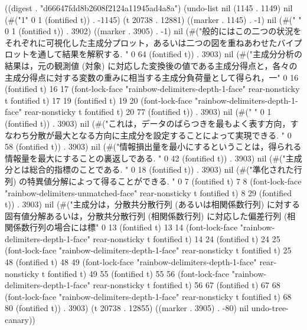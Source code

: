 
((digest . "d66647fdd8b2608f2124a11945ad4a8a") (undo-list nil (1145 . 1149) nil (#("1" 0 1 (fontified t)) . -1145) (t 20738 . 12881) ((marker . 1145) . -1) nil (#("
" 0 1 (fontified t)) . 3902) ((marker . 3905) . -1) nil (#("般的にはこの二つの状況をそれぞれに可視化した主成分プロット，あるいは二つの図を重ねあわせたバイプロットを通して結果を解釈する.
" 0 64 (fontified t)) . 3903) nil (#("主成分分析の結果は，元の観測値 (対象) に対応した変換後の値である主成分得点と，各々の主成分得点に対する変数の重みに相当する主成分負荷量として得られ，一" 0 16 (fontified t) 16 17 (font-lock-face "rainbow-delimiters-depth-1-face" rear-nonsticky t fontified t) 17 19 (fontified t) 19 20 (font-lock-face "rainbow-delimiters-depth-1-face" rear-nonsticky t fontified t) 20 77 (fontified t)) . 3903) nil (#("
" 0 1 (fontified t)) . 3903) nil (#("これは，データのばらつきを最もよく表す方向，すなわち分散が最大となる方向に主成分を設定することによって実現できる.
" 0 58 (fontified t)) . 3903) nil (#("情報損出量を最小にするということは，得られる情報量を最大にすることの裏返しである.
" 0 42 (fontified t)) . 3903) nil (#("主成分とは総合的指標のことである.
" 0 18 (fontified t)) . 3903) nil (#("準化された行列) の特異値分解によって得ることができる.
" 0 7 (fontified t) 7 8 (font-lock-face "rainbow-delimiters-unmatched-face" rear-nonsticky t fontified t) 8 29 (fontified t)) . 3903) nil (#("主成分は，分散共分散行列 (あるいは相関係数行列) に対する固有値分解あるいは，分散共分散行列 (相関係数行列) に対応した偏差行列 (相関係数行列の場合には標" 0 13 (fontified t) 13 14 (font-lock-face "rainbow-delimiters-depth-1-face" rear-nonsticky t fontified t) 14 24 (fontified t) 24 25 (font-lock-face "rainbow-delimiters-depth-1-face" rear-nonsticky t fontified t) 25 48 (fontified t) 48 49 (font-lock-face "rainbow-delimiters-depth-1-face" rear-nonsticky t fontified t) 49 55 (fontified t) 55 56 (font-lock-face "rainbow-delimiters-depth-1-face" rear-nonsticky t fontified t) 56 67 (fontified t) 67 68 (font-lock-face "rainbow-delimiters-depth-1-face" rear-nonsticky t fontified t) 68 80 (fontified t)) . 3903) (t 20738 . 12855) ((marker . 3905) . -80) nil undo-tree-canary))
